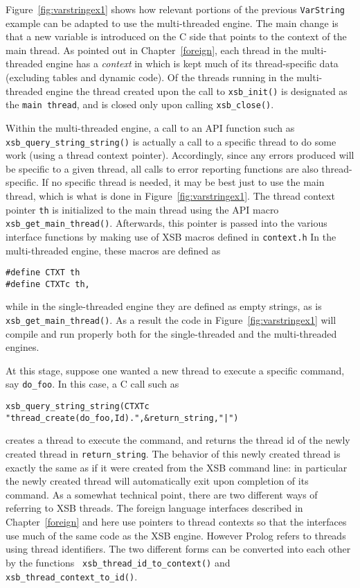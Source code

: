 Figure~\ref{fig:varstringex1} shows how relevant portions of the
previous {\tt VarString} example can be adapted to use the
multi-threaded engine.  The main change is that a new variable is
introduced on the C side that points to the context of the main
thread.  As pointed out in Chapter~\ref{foreign}, each thread in the
multi-threaded engine has a {\em context} in which is kept much of its
thread-specific data (excluding tables and dynamic code).  Of the
threads running in the multi-threaded engine the thread created upon
the call to {\tt xsb\_init()} is designated as the {\tt main thread},
and is closed only upon calling {\tt xsb\_close()}.

Within the multi-threaded engine, a call to an API function such as
{\tt xsb\_query\_string\_string()} is actually a call to a specific
thread to do some work (using a thread context pointer).  Accordingly,
since any errors produced will be specific to a given thread, all
calls to error reporting functions are also thread-specific.  If no
specific thread is needed, it may be best just to use the main thread,
which is what is done in Figure~\ref{fig:varstringex1}.  The thread
context pointer {\tt th} is initialized to the main thread using the
API macro {\tt xsb\_get\_main\_thread()}.  Afterwards, this pointer is
passed into the various interface functions by making use of XSB
macros defined in {\tt context.h} In the multi-threaded engine, these
macros are defined as
%
\begin{verbatim}
#define CTXT th
#define CTXTc th,
\end{verbatim}
%
while in the single-threaded engine they are defined as empty strings,
as is {\tt xsb\_get\_main\_thread()}.  As a result the code in
Figure~\ref{fig:varstringex1} will compile and run properly both for
the single-threaded and the multi-threaded engines.

At this stage, suppose one wanted a new thread to execute a specific
command, say {\tt do\_foo}.  In this case, a C call such as 
%
\begin{verbatim}
xsb_query_string_string(CTXTc "thread_create(do_foo,Id).",&return_string,"|")
\end{verbatim}
creates a thread to execute the command, and returns the thread id of
the newly created thread in {\tt return\_string}.  The behavior of
this newly created thread is exactly the same as if it were created
from the XSB command line: in particular the newly created thread will
automatically exit upon completion of its command.  As a somewhat
technical point, there are two different ways of referring to XSB
threads.  The foreign language interfaces described in
Chapter~\ref{foreign} and here use pointers to thread contexts so that
the interfaces use much of the same code as the XSB engine.  However
Prolog refers to threads using thread identifiers.  The two different
forms can be converted into each other by the functions {\tt
  xsb\_thread\_id\_to\_context()} and {\tt
  xsb\_thread\_context\_to\_id()}.

